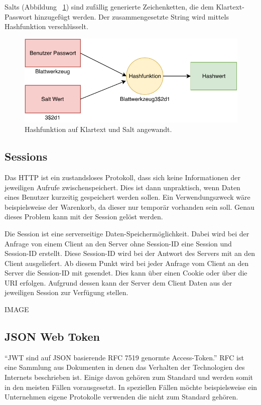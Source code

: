  Salts (Abbildung ~\ref{fig:salted-hash}) sind zufällig generierte Zeichenketten, die dem Klartext-Passwort hinzugefügt werden. Der zusammengesetzte String wird mittels Hashfunktion verschlüsselt.

\begin{figure}
	\centering
	\includegraphics[width=.89\textwidth]{graphics/salting.pdf}
	\caption{Hashfunktion auf Klartext und Salt angewandt.}
	\label{fig:salted-hash}
\end{figure}

\subsection{Sessions}
\label{sec: sessions}

Das \gls{HTTP} ist ein zustandsloses Protokoll, dass sich keine Informationen der jeweiligen Aufrufe zwischenspeichert. Dies ist dann unpraktisch, wenn Daten eines Benutzer kurzeitig gespeichert werden sollen.  Ein Verwendungszweck wäre beispielsweise der Warenkorb, da dieser nur temporär vorhanden sein soll. Genau dieses Problem kann mit der Session gelöst werden.

Die Session ist eine serverseitige Daten-Speichermöglichkeit. Dabei wird bei der Anfrage von einem Client an den Server ohne Session-ID eine Session und Session-ID erstellt. Diese Session-ID wird bei der Antwort des Servers mit an den Client ausgeliefert. Ab diesem Punkt wird bei jeder Anfrage vom Client an den Server die Session-ID mit gesendet. Dies kann über einen Cookie oder über die \gls{URI} erfolgen. Aufgrund dessen kann der Server dem Client Daten aus der jeweiligen Session zur Verfügung stellen.

IMAGE

\subsection{JSON Web Token}
\label{sec: jwt}
\enquote{\gls{JWT} sind auf \gls{JSON} basierende \gls{RFC} 7519 genormte Access-Token.} \gls{RFC} ist eine Sammlung aus Dokumenten in denen das Verhalten der Technologien des Internets beschrieben ist. Einige davon gehören zum Standard und werden somit in den meisten Fällen vorausgesetzt. In speziellen Fällen möchte beispielsweise ein Unternehmen eigene Protokolle verwenden die nicht zum Standard gehören.

